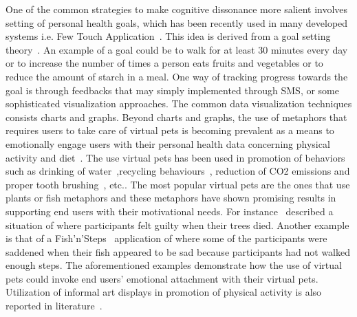 One of the common strategies to make cognitive dissonance more salient involves setting of personal health goals, which has been recently used in many developed systems i.e. Few Touch Application~\citep{arsand:mobile}. This idea is derived from a goal setting theory~\citep{strecher1995goal}. An example of a goal could be to walk for at least 30 minutes every day or to increase the number of times a person eats fruits and vegetables or to reduce the amount of starch in a meal. One way of tracking progress towards the goal is through feedbacks that may simply implemented through SMS, or some sophisticated visualization approaches. The common data visualization techniques consists charts and graphs. Beyond charts and graphs, the use of metaphors that requires users to take care of virtual pets is becoming prevalent as a means to emotionally engage users with their personal health data concerning physical activity and diet~\citep{lin2006:fish,albaina2009flowie,klasnja2009:using,pollak2010s,nakajima2013designing}. The use virtual pets has been used in promotion of behaviors such as drinking of water~\citep{lessel2016watercoaster},recycling behaviours~\citep{comber2013designing}, reduction of CO2 emissions and proper tooth brushing~\citep{nakajima2013designing}, etc.. The most popular virtual pets are the ones that use plants or fish metaphors and these metaphors have shown promising results in supporting end users with their motivational needs. For instance~\cite{nakajima2013designing} described a situation of where participants felt guilty when their trees died. Another example is that of a Fish'n'Steps~\citep{lin2006:fish} application of where some of the participants were saddened when their fish appeared to be sad because participants had not walked enough steps. The aforementioned examples demonstrate how the use of virtual pets could invoke end users' emotional attachment with their virtual pets. Utilization of informal art displays in promotion of physical activity is also reported in literature~\citep{fan2012spark,nakajima2013designing}. 

